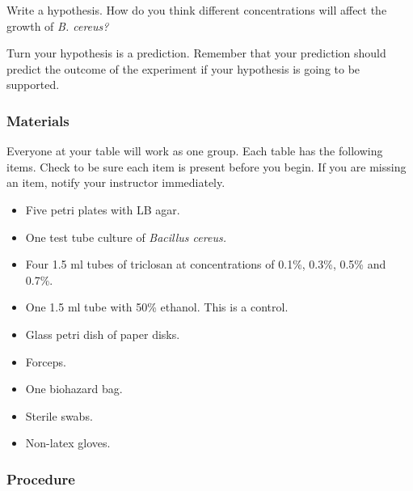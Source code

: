 \documentclass[12pt]{exam}
\begin{document}
\begin{questions}

\question
Write a hypothesis. How do you think different concentrations will affect the growth of \textit{B. cereus?}

\newpage

\question
Turn your hypothesis is a prediction. Remember that your prediction should predict the outcome of the experiment if your hypothesis is going to be supported. 

\vspace*{3\baselineskip}

\subsubsection*{Materials}

Everyone at your table will work as one group. Each table has the following items. Check to be sure each item is present before you begin. If you are missing an item, notify your instructor immediately.

\begin{itemize}

	\item Five petri plates with LB agar.
	
	\item One test tube culture of \textit{Bacillus cereus.}
	
	\item Four 1.5 ml tubes of triclosan at concentrations of 0.1\%, 0.3\%, 0.5\% and 0.7\%.
	
	\item One 1.5 ml tube with 50\% ethanol. This is a control.

	\item Glass petri dish of paper disks.
	
	\item Forceps.
	
	\item One biohazard bag.
	
	\item Sterile swabs.
	
	\item Non-latex gloves.
	
\end{itemize}

\subsubsection*{Procedure}


\end{questions}
\end{document}
